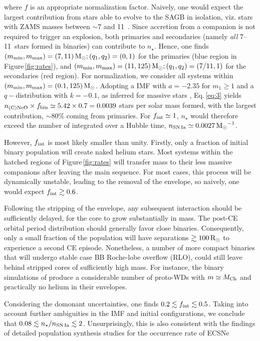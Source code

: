 \documentclass[twocolumn,tighten,times]{aastex62}
\begin{document}
where $f$ is an appropriate normalization factor. 
Naively, one would expect the largest contribution from stars able to evolve
to the SAGB in isolation, viz. stars with ZAMS masses between $\sim 7$ and 11\msun\ \citep{Farmer:2015afs}. 
Since accretion from a companion is not required to trigger an explosion, 
both primaries and secondaries (namely \emph{all} 7--11\msun\ stars formed in binaries) 
can contribute to $n_\star$. Hence, one finds $(m_{\rm min},m_{\rm max})=(7,11)\mathrm{\,M_\odot};(q_1,q_2)=(0,1)$ for the primaries (blue region in 
Figure\,\ref{fig:rates}), and $(m_{\rm min},m_{\rm max})=(11,125)\mathrm{\,M_\odot};(q_1,q_2)=(7/11,1)$ for the secondaries (red region). For normalization, we consider all systems within $(m_{\rm min},m_{\rm max})=(0.1,125)\mathrm{\,M_\odot}$. Adopting a 
\cite{Chabrier:2004vw} IMF with $a=-2.35$ for $m_1 \ge 1$ and a $q-$distribution with $k=-0.1$, as inferred for massive stars \citep{Sana:2012px},
Eq.\,\ref{eq:3} yields $n_{\rm \one}\times f_{\rm bin} \simeq 5.42\times 0.7=0.0039$ stars per solar mass formed, with the largest contribution, $\sim 80\%$ coming from primaries. For $f_{\rm int}\simeq 1$, $n_\star$ would therefore exceed the number of \ia  integrated over a Hubble time, $n_{\rm SN\,Ia}\simeq0.0027\mathrm{\,M_\odot}^{-1}$.

However, $f_{\rm int}$ is most likely smaller than unity. Firstly, only a fraction of 
initial binary population will create naked helium stars. Most  systems within the 
hatched regions of Figure\,\ref{fig:rates} will transfer mass to their less massive 
companions after leaving the main sequence. For most cases, this  process will be 
dynamically unstable, leading to the removal of the envelope, so naively, one would 
expect $f_{\rm int}\gtrsim 0.6$. 

Following the stripping of the envelope, any 
subsequent interaction should be sufficiently delayed, for the core to 
grow substantially in mass. The post-CE orbital period distribution should generally 
favor close binaries. Consequently, only a small fraction of the population will have 
separations $\gtrsim 100\mathrm{\,R_\odot}$ to experience a second CE episode. 
Nonetheless, a number of more compact binaries that will undergo stable case BB Roche-lobe 
overflow (RLO), could still leave behind stripped \one cores of sufficiently high mass. For instance, the
binary simulations of \cite{Tauris:2015xra} produce a considerable number of \one proto-WDs 
with $m\simeq M_{\mathrm{Ch}}$ and practically no helium in their envelopes.  

Considering the domonant uncertainties, one finds $0.2 \lesssim f_{\rm int}\lesssim 0.5$. 
Taking into account further ambiguities in the IMF and initial configurations, we conclude that $0.08\lesssim n_\star / n_{\rm SN\,Ia} \lesssim 2$. Unsurprisingly, this is also consistent with the findings of detailed population synthesis studies for the occurrence rate of ECSNe \citep[e.g.][]{Jones:2018ule}
\end{document}

